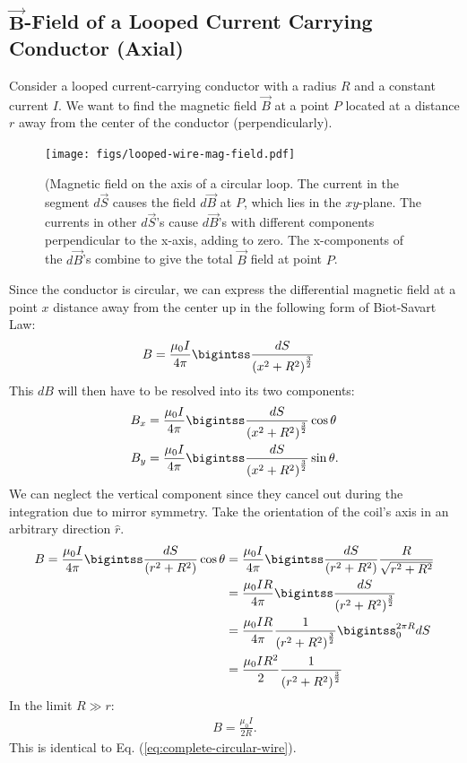 \documentclass[12pt,b4paper]{article}
\begin{document}
\subsection{$\boldsymbol{\vec{B}}$-Field of a Looped Current Carrying Conductor (Axial)}
Consider a looped current-carrying conductor with a radius $R$ and a constant current $I$. We want to find the magnetic field $\vec{B}$ at a point $P$ located at a distance $r$ away from the center of the conductor (perpendicularly).
\begin{figure}
    \centering
    \texttt{[image: figs/looped-wire-mag-field.pdf]}
    \caption{(Magnetic field on the axis of a circular loop. The current in the segment $d\vec{S}$ causes the field $d\vec{B}$ at $P$, which lies in the $xy$-plane. The currents in other $d\vec{S}$’s cause $d\vec{B}$’s with different components perpendicular to the x-axis, adding to zero. The x-components of the $d\vec{B}$’s combine to give the total $\vec{B}$ field at point $P$.}
    \label{fig:looped-wire-mag-field}
\end{figure}
Since the conductor is circular, we can express the differential magnetic field at a point $x$ distance away from the center up in the following form of Biot-Savart Law:
\begin{align}
    B&=\frac{\mu_0I}{4\pi}\bigintss\frac{dS}{\left(x^2+R^2\right)^{\frac{3}{2}}}
\end{align}
This $dB$ will then have to be resolved into its two components:
\begin{align}
    B_x&=\frac{\mu_0I}{4\pi}\bigintss\frac{dS}{\left(x^2+R^2\right)^{\frac{3}{2}}}\cos\theta\\
    B_y&=\frac{\mu_0I}{4\pi}\bigintss\frac{dS}{\left(x^2+R^2\right)^{\frac{3}{2}}}\sin\theta.
\end{align}
We can neglect the vertical component since they cancel out during the integration due to mirror symmetry. Take the orientation of the coil's axis in an arbitrary direction $\hat{r}$.
\begin{align}
    B=\frac{\mu_0I}{4\pi}\bigintss\frac{dS}{\left(r^2+R^2\right)}\cos\theta&=\frac{\mu_0I}{4\pi}\bigintss\frac{dS}{\left(r^2+R^2\right)}\frac{R}{\sqrt{r^2+R^2}}\notag\\
    &=\frac{\mu_0IR}{4\pi}\bigintss\frac{dS}{\left(r^2+R^2\right)^{\frac{3}{2}}}\notag\\
    &=\frac{\mu_0IR}{4\pi}\frac{1}{\left(r^2+R^2\right)^{\frac{3}{2}}}\bigintss_0^{2\pi R} dS\notag\\
    &=\frac{\mu_0IR^2}{2}\frac{1}{\left(r^2+R^2\right)^{\frac{3}{2}}}
\end{align}
In the limit $R\gg r$:
\begin{align}
    B=\frac{\mu_0I}{2R}.
\end{align}
This is identical to Eq. (\ref{eq:complete-circular-wire}).
\end{document}
